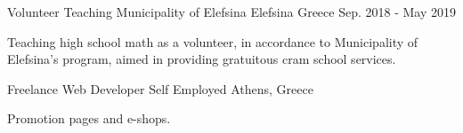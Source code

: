 \begin{cventries}


  \cventry
    {Volunteer Teaching} %
    {Municipality of Elefsina} %
    {Elefsina Greece} %
    {Sep. 2018 - May 2019} %
    {
      \begin{cvitems} %
        \item {Teaching high school math as a volunteer, in accordance to Municipality of Elefsina's program, aimed in providing gratuitous cram school services.}
      \end{cvitems}
    }

\cventry
{Freelance Web Developer} %
{Self Employed} %
{Athens, Greece} %
{} %
{
	\begin{cvitems} %
		\item {Promotion pages and e-shops.}
	\end{cvitems}	
}

\end{cventries}
